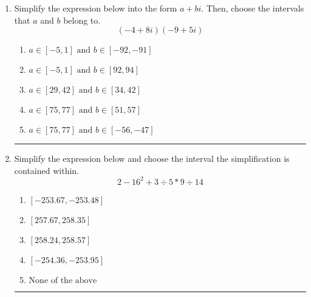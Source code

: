 \documentclass[14pt]{extbook}
\newcommand{\litem}[1]{\item#1\hspace*{-1cm}\rule{\textwidth}{0.4pt}}
\begin{document}
\begin{enumerate}
{\begin{enumerate}[label=\Alph*.]
\end{enumerate} }
\litem{
Simplify the expression below into the form $a+bi$. Then, choose the intervals that $a$ and $b$ belong to.\[ (-4 + 8 i)(-9 + 5 i) \]\begin{enumerate}[label=\Alph*.]
\item \( a \in [-5, 1] \text{ and } b \in [-92, -91] \)
\item \( a \in [-5, 1] \text{ and } b \in [92, 94] \)
\item \( a \in [29, 42] \text{ and } b \in [34, 42] \)
\item \( a \in [75, 77] \text{ and } b \in [51, 57] \)
\item \( a \in [75, 77] \text{ and } b \in [-56, -47] \)

\end{enumerate} }
\litem{
Simplify the expression below and choose the interval the simplification is contained within.\[ 2 - 16^2 + 3 \div 5 * 9 \div 14 \]\begin{enumerate}[label=\Alph*.]
\item \( [-253.67, -253.48] \)
\item \( [257.67, 258.35] \)
\item \( [258.24, 258.57] \)
\item \( [-254.36, -253.95] \)
\item \( \text{None of the above} \)

\end{enumerate} }
\end{enumerate}
\end{document}

